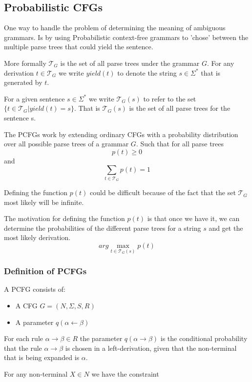 \subsection{Probabilistic CFGs}
One way to handle the problem of determining the meaning of ambiguous grammars.
Is by using Probabilistic context-free grammars to 'chose' between the multiple
parse trees that could yield the sentence. 

More formally $\mathcal{T}_G$ is the set of all parse trees under the grammar $G$.
For any derivation $t \in \mathcal{T}_G$ we write $yield(t)$ to denote the string
$s \in \Sigma^*$ that is generated by $t$. 

For a given sentence $s \in \Sigma^*$ we write $\mathcal{T}_G(s)$ to refer to the
set $\{t \in \mathcal{T}_G \vert yield(t) = s \}$.
That is $\mathcal{T}_G(s)$ is the set of all parse trees for the sentence s.

The PCFGs work by extending ordinary CFGs with a probability distribution over 
all possible parse trees of a grammar $G$. Such that for all parse trees 
$$p(t) \geq 0$$ 
and 
$$\sum_{t \in \mathcal{T}_G}p(t) = 1$$ 

Defining the function $p(t)$ could be difficult because of the fact that the set $\mathcal{T}_G$ most likely will be infinite.

\cite[p.6]{collins}

The motivation for defining the function $p(t)$ is that once we have it,
we can determine the probabilities of the different parse trees for a 
string $s$ and get the most likely derivation. 
$$arg \max_{t \in \mathcal{T}_G(s)} p(t)$$

\cite[p.7]{collins}

\subsubsection{Definition of PCFGs}

A PCFG consists of:
\begin{itemize}
\item A CFG $G = (N, \Sigma, S, R)$
\item A parameter $q(\alpha \leftarrow \beta)$
\end{itemize}
For each rule $\alpha \rightarrow \beta \in R$ the parameter $q(\alpha \rightarrow \beta)$ is
the conditional probability that the rule $\alpha \rightarrow \beta$ is chosen in a left-derivation,
given that the non-terminal that is being expanded is $\alpha$.

For any non-terminal $X \in N$ we have the constraint

